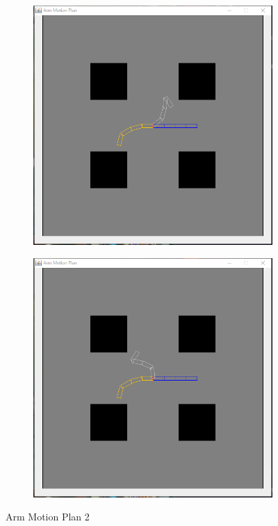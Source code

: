 \documentclass{article}
\begin{document}
\begin{figure}[!htb]
\centering
\begin{subfigure}{0.4\textwidth}
  \includegraphics[width=\linewidth]{arm_3}
\end{subfigure}
\begin{subfigure}{0.4\textwidth}
  \includegraphics[width=\linewidth]{arm_4}
\end{subfigure}
\caption{Arm Motion Plan 2}
\end{figure}
\end{document}
